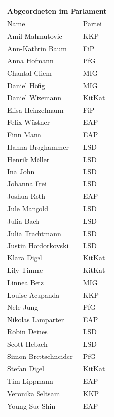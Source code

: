 \documentclass{sasbase}
\begin{document}
\begin{center}
    \begin{tabular}{ |p{5cm}|p{3cm}| }
     \hline
     \multicolumn{2}{|c|}{Abgeordneten im Parlament} \\
     \hline
     Name & Partei \\
     \hline
    Amil Mahmutovic & KKP \\
    Ann-Kathrin Baum & FiP\\
    Anna Hofmann & PfG\\
    Chantal Gliem & MIG\\
    Daniel Höfig & MIG\\
    Daniel Wizemann & KitKat\\
    Elisa Heinzelmann & FiP\\
    Felix Wüstner & EAP\\
    Finn Mann & EAP\\
    Hanna Broghammer & LSD\\
    Henrik Möller & LSD\\
    Ina John & LSD\\
    Johanna Frei & LSD\\
    Joshua Roth & EAP\\
    Jule Mangold & LSD\\
    Julia Bach & LSD\\
    Julia Trachtmann & LSD\\
    Justin Hordorkovski & LSD\\
    Klara Digel & KitKat\\
    Lily Timme & KitKat\\
    Linnea Betz & MIG\\
    Louise Acupanda & KKP\\
    Nele Jung & PfG\\
    Nikolas Lamparter & EAP\\
    Robin Deines & LSD\\
    Scott Hebach & LSD\\
    Simon Brettschneider & PfG\\
    Stefan Digel & KitKat\\
    Tim Lippmann & EAP\\
    Veronika Seltsam & KKP\\
    Young-Sue Shin & EAP\\
     \hline
    \end{tabular}
\end{center}
\end{document}
